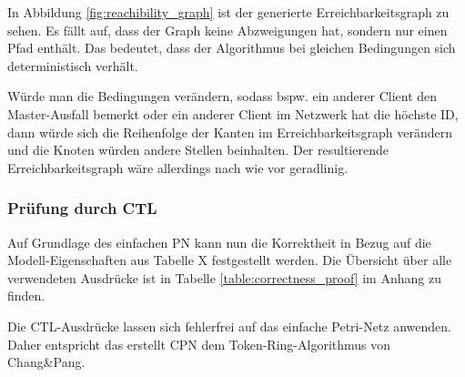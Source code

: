 In Abbildung \ref{fig:reachibility_graph} ist der generierte Erreichbarkeitsgraph zu sehen. Es fällt auf, dass der Graph keine Abzweigungen hat, sondern nur einen Pfad enthält. Das bedeutet, dass der Algorithmus bei gleichen Bedingungen sich deterministisch verhält.

Würde man die Bedingungen verändern, sodass bspw. ein anderer Client den Master-Ausfall bemerkt oder ein anderer Client im Netzwerk hat die höchste ID, dann würde sich die Reihenfolge der Kanten im Erreichbarkeitsgraph verändern und die Knoten würden andere Stellen beinhalten. Der resultierende Erreichbarkeitsgraph wäre allerdings nach wie vor geradlinig.

\subsubsection{Prüfung durch CTL}
Auf Grundlage des einfachen PN kann nun die Korrektheit in Bezug auf die Modell-Eigenschaften aus Tabelle X festgestellt werden. Die Übersicht über alle verwendeten Ausdrücke ist in Tabelle \ref{table:correctness_proof} im Anhang zu finden.

Die CTL-Ausdrücke lassen sich fehlerfrei auf das einfache Petri-Netz anwenden. Daher entspricht das erstellt CPN dem Token-Ring-Algorithmus von Chang\&Pang.
